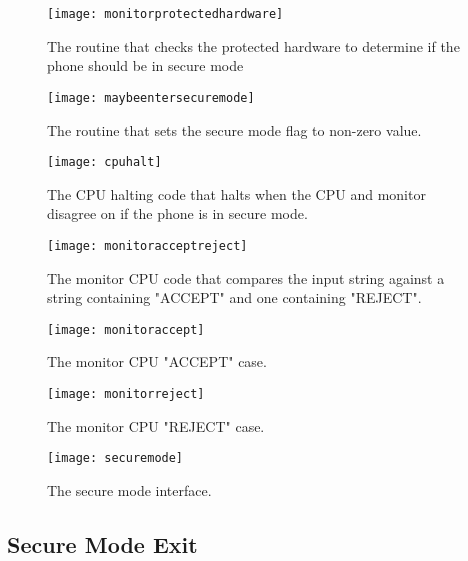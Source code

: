 \begin{figure}
  \centering
  \texttt{[image: monitorprotectedhardware]}
  \caption{The routine that checks the protected hardware to determine if the phone should be in secure mode}
  \label{fig:monitorprotectedhardware}
\end{figure}

\begin{figure}
  \centering
  \texttt{[image: maybeentersecuremode]}
  \caption{The routine that sets the secure mode flag to non-zero value.}
  \label{fig:maybeentersecuremode}
\end{figure}

\begin{figure}
  \centering
  \texttt{[image: cpuhalt]}
  \caption{The CPU halting code that halts when the CPU and monitor disagree on if the phone is in secure mode.}
  \label{fig:cpuhalt}
\end{figure}

\begin{figure}
  \centering
  \texttt{[image: monitoracceptreject]}
  \caption{The monitor CPU code that compares the input string against a string containing "ACCEPT" and one containing "REJECT".}
  \label{fig:monitoracceptreject}
\end{figure}

\begin{figure}
  \centering
  \texttt{[image: monitoraccept]}
  \caption{The monitor CPU "ACCEPT" case.}
  \label{fig:monitoraccept}
\end{figure}

\begin{figure}
  \centering
  \texttt{[image: monitorreject]}
  \caption{The monitor CPU "REJECT" case.}
  \label{fig:monitorreject}
\end{figure}

\begin{figure}
  \centering
  \texttt{[image: securemode]}
  \caption{The secure mode interface.}
  \label{fig:securemode}
\end{figure}


\subsection{Secure Mode Exit}

